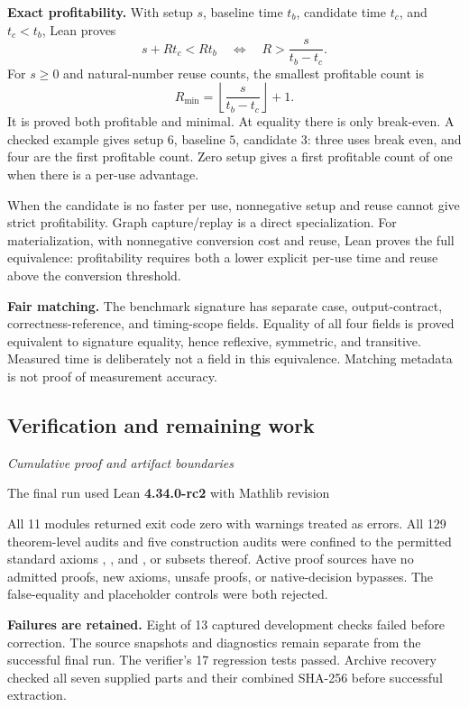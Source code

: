 \textbf{Exact profitability.} With setup $s$, baseline time $t_b$, candidate time $t_c$, and $t_c<t_b$, Lean proves
\[
\boxed{s+Rt_c<Rt_b\quad\Longleftrightarrow\quad
R>\frac{s}{t_b-t_c}.}
\]
For $s\geq0$ and natural-number reuse counts, the smallest profitable count is
\[
\boxed{R_{\min}=\left\lfloor\frac{s}{t_b-t_c}\right\rfloor+1.}
\]
It is proved both profitable and minimal. At equality there is only break-even. A checked example gives setup $6$, baseline $5$, candidate $3$: three uses break even, and four are the first profitable count. Zero setup gives a first profitable count of one when there is a per-use advantage.

When the candidate is no faster per use, nonnegative setup and reuse cannot give strict profitability. Graph capture/replay is a direct specialization. For materialization, with nonnegative conversion cost and reuse, Lean proves the full equivalence: profitability requires both a lower explicit per-use time and reuse above the conversion threshold.

\textbf{Fair matching.} The benchmark signature has separate case, output-contract, correctness-reference, and timing-scope fields. Equality of all four fields is proved equivalent to signature equality, hence reflexive, symmetric, and transitive. Measured time is deliberately not a field in this equivalence. Matching metadata is not proof of measurement accuracy.



\subsection{Verification and remaining work}\label{supp2:subsection:007}\textit{Cumulative proof and artifact boundaries}\par
The final run used Lean \textbf{4.34.0-rc2} with Mathlib revision
\begin{center}\end{center}
All 11 modules returned exit code zero with warnings treated as errors. All 129 theorem-level audits and five construction audits were confined to the permitted standard axioms , , and , or subsets thereof. Active proof sources have no admitted proofs, new axioms, unsafe proofs, or native-decision bypasses. The false-equality and placeholder controls were both rejected.

\textbf{Failures are retained.} Eight of 13 captured development checks failed before correction. The source snapshots and diagnostics remain separate from the successful final run. The verifier's 17 regression tests passed. Archive recovery checked all seven supplied parts and their combined SHA-256 before successful extraction.

